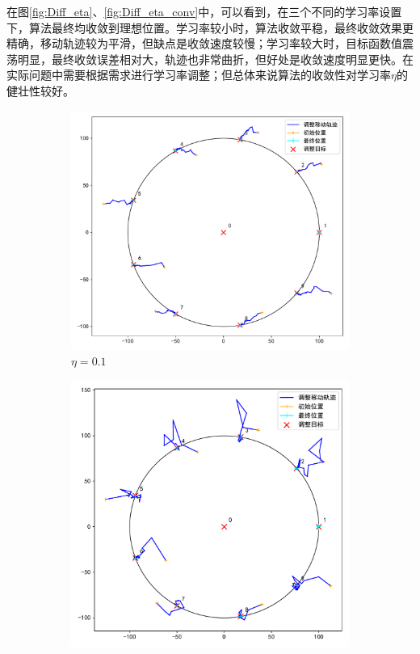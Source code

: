 \documentclass[withoutpreface,bwprint]{cumcmthesis} %
\begin{document}
在图\ref{fig:Diff_eta}、\ref{fig:Diff_eta_conv}中，可以看到，在三个不同的学习率设置下，算法最终均收敛到理想位置。学习率较小时，算法收敛平稳，最终收敛效果更精确，移动轨迹较为平滑，但缺点是收敛速度较慢；学习率较大时，目标函数值震荡明显，最终收敛误差相对大，轨迹也非常曲折，但好处是收敛速度明显更快。在实际问题中需要根据需求进行学习率调整；但总体来说算法的收敛性对学习率$\eta$的健壮性较好。
\begin{figure}[H]
    \centering
    \begin{subfigure}{0.33\linewidth}
        \includegraphics[width=1\linewidth]{figures/c9_lr0-1_.pdf}
        \caption{$\eta=0.1$}
    \end{subfigure}
    \begin{subfigure}{0.31\linewidth}
        \includegraphics[width=1\linewidth]{figures/c9_lr0-5.pdf}

\end{subfigure}
\end{figure}
\end{document}
